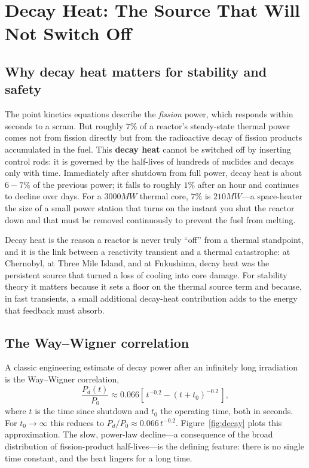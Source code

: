 \chapter{Decay Heat: The Source That Will Not Switch Off}
\label{ch:decay}

\section{Why decay heat matters for stability and safety}

The point kinetics equations describe the \emph{fission} power, which responds
within seconds to a scram. But roughly $7\%$ of a reactor's steady-state thermal
power comes not from fission directly but from the radioactive decay of fission
products accumulated in the fuel. This \textbf{decay heat} cannot be switched off
by inserting control rods: it is governed by the half-lives of hundreds of
nuclides and decays only with time. Immediately after shutdown from full power,
decay heat is about $6\!-\!7\%$ of the previous power; it falls to roughly $1\%$
after an hour and continues to decline over days. For a $3000\unit{MW}$ thermal
core, $7\%$ is $210\unit{MW}$---a space-heater the size of a small power
station that turns on the instant you shut the reactor down and that must be
removed continuously to prevent the fuel from melting.

Decay heat is the reason a reactor is never truly ``off'' from a thermal
standpoint, and it is the link between a reactivity transient and a thermal
catastrophe: at Chernobyl, at Three Mile Island, and at Fukushima, decay heat
was the persistent source that turned a loss of cooling into core damage. For
stability theory it matters because it sets a floor on the thermal source term
and because, in fast transients, a small additional decay-heat contribution adds
to the energy that feedback must absorb.

\section{The Way--Wigner correlation}

A classic engineering estimate of decay power after an infinitely long
irradiation is the Way--Wigner correlation,
\begin{equation}
\frac{P_d(t)}{P_0} \approx 0.066\left[\,t^{-0.2} - (t+t_0)^{-0.2}\,\right],
\label{eq:waywigner}
\end{equation}
where $t$ is the time since shutdown and $t_0$ the operating time, both in
seconds. For $t_0\to\infty$ this reduces to $P_d/P_0\approx 0.066\,t^{-0.2}$.
Figure~\ref{fig:decay} plots this approximation. The slow, power-law decline---a
consequence of the broad distribution of fission-product half-lives---is the
defining feature: there is no single time constant, and the heat lingers for a
long time.

